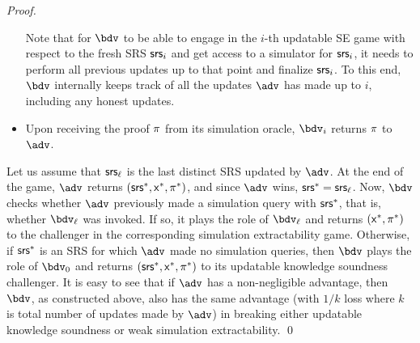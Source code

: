 \begin{proof}
\begin{itemize}
		Note that for $\bdv$ to be able to engage in the $i$-th updatable SE game with respect to the fresh SRS $\mathsf{srs}_{i}$ and get access to a simulator for $\mathsf{srs}_{i}$, it needs to perform all previous updates up to that point and finalize $\mathsf{srs}_{i}$. To this end, $\bdv$  internally keeps track of all the updates $\advse$ has made up to $i$, including any honest updates.
		
		\item
		Upon receiving the proof $\pi$ from its simulation oracle, $\bdv_i$ returns $\pi$ to $\advse$.
		
	\end{itemize}
	
	
	Let us assume that $\mathsf{srs}_\ell$ is the last distinct SRS updated by $\advse$. 
	At the end of the game, $\advse$ returns $(\mathsf{srs}^*, \mathsf{x}^*, \pi^*)$, and since $\advse$ wins, $\mathsf{srs}^* = \mathsf{srs}_\ell$. Now, $\bdv$ checks whether 
	$\advse$ previously made a simulation query with
	$\mathsf{srs}^*$, that is, whether $\bdv_\ell$ was invoked. 
	If so, it plays the role of $\bdv_\ell$ and returns $(\mathsf{x}^*, \pi^*)$ to the challenger in the corresponding simulation extractability game. 
	Otherwise, if $\mathsf{srs}^*$ is an SRS for which $\advse$ made no simulation queries, then $\bdv$ plays the role of $\bdv_0$ and returns $(\mathsf{srs}^*, \mathsf{x}^*, \pi^*)$ to its updatable knowledge soundness challenger. It is easy to see that if $\advse$ has a non-negligible advantage, then $\bdv$, as constructed above, also has the same advantage (with $1/k$ loss where $k$ is total number of updates made by $\advse$) in breaking either updatable knowledge soundness or weak simulation extractability.
\qed
\end{proof}